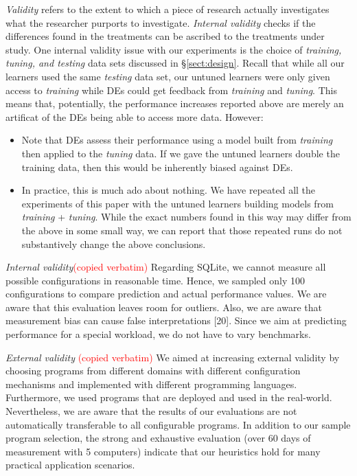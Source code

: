 \documentclass{sig-alternative}
\newcommand{\bi}{\begin{itemize}[leftmargin=0.4cm]}
\newcommand{\ei}{\end{itemize}}
\newcommand{\tion}[1]{\S\ref{sect:#1}}
\begin{document}
{\em Validity} refers to the extent to which a piece of research actually
investigates what the researcher purports to investigate.
{\em Internal validity} checks if the differences found in
the treatments can be ascribed to the treatments under study. 
One internal validity issue with our experiments is the choice
of {\em training, tuning, and testing} data sets discussed in 
\tion{design}. Recall that while all our learners used the same
{\em testing} data set, our untuned learners were only given
access to {\em training} while DEs could get feedback from
{\em training} and
{\em tuning}.  This means that, potentially,  the performance increases
reported above are merely an artificat of the DEs being able to access
more data. However:
\bi
\item Note that
DEs assess their performance using a model built from {\em training}
then applied to the {\em tuning} data. If we gave the untuned
learners double the training data, then this would be inherently
biased against DEs.
\item In practice, this is much ado about nothing. We have
repeated all the experiments of this paper with the untuned
learners building models from {\em training} + {\em tuning}.
While the exact numbers found in this way
may differ from the above in some small way, we can report that 
those repeated runs do not substantively change the above conclusions.
\ei

{\em Internal validity}\textcolor{red}{(copied verbatim)}
Regarding SQLite, we cannot measure all possible configurations in reasonable time. Hence, we sampled only 100 configurations to compare prediction and actual performance values. We are aware that this evaluation leaves room for outliers.
Also, we are aware that measurement bias can cause false interpretations [20]. Since we aim at predicting performance for a special workload, we do not have to vary benchmarks.



{\em External validity} \textcolor{red}{(copied verbatim)} We aimed at increasing external validity by choosing programs from different domains with different configuration mechanisms and implemented with different programming languages. Furthermore, we used programs that are deployed and used in the real-world. Nevertheless, we are aware that the results of our evaluations are not automatically transferable to all configurable programs. In addition to our sample program selection, the strong and exhaustive evaluation (over 60 days of measurement with 5 computers) indicate that our heuristics hold for many practical application scenarios.
\end{document}
